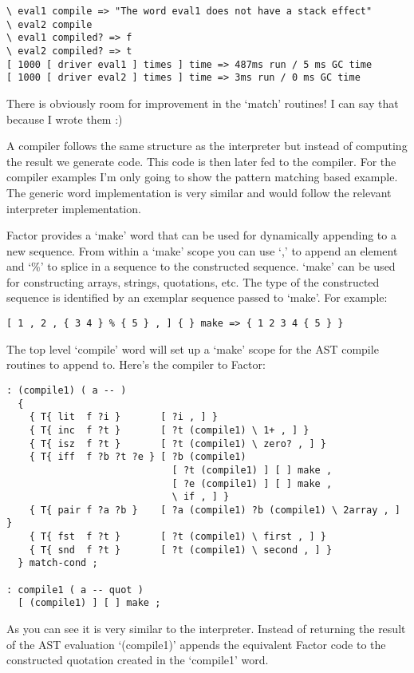 \begin{verbatim}
\ eval1 compile => "The word eval1 does not have a stack effect"
\ eval2 compile 
\ eval1 compiled? => f
\ eval2 compiled? => t
[ 1000 [ driver eval1 ] times ] time => 487ms run / 5 ms GC time
[ 1000 [ driver eval2 ] times ] time => 3ms run / 0 ms GC time
\end{verbatim}

There is obviously room for improvement in the `match' routines! I can
say that because I wrote them :)

A compiler follows the same structure as the interpreter but instead
of computing the result we generate code. This code is then later fed
to the compiler. For the compiler examples I'm only going to show the
pattern matching based example. The generic word implementation is
very similar and would follow the relevant interpreter implementation.

Factor provides a `make' word that can be used for dynamically appending to a new sequence. From
within a `make' scope you can use `,' to append an element and `\%' to splice in a sequence to the
constructed sequence. `make' can be used for constructing arrays, strings, quotations, etc. The type
of the constructed sequence is identified by an exemplar sequence passed to `make'. For example:

\begin{verbatim}
[ 1 , 2 , { 3 4 } % { 5 } , ] { } make => { 1 2 3 4 { 5 } }
\end{verbatim}

The top level `compile' word will set up a `make' scope for the AST
compile routines to append to. Here's the compiler to Factor:

\begin{verbatim}
: (compile1) ( a -- )
  {
    { T{ lit  f ?i }       [ ?i , ] }
    { T{ inc  f ?t }       [ ?t (compile1) \ 1+ , ] }
    { T{ isz  f ?t }       [ ?t (compile1) \ zero? , ] }
    { T{ iff  f ?b ?t ?e } [ ?b (compile1) 
                             [ ?t (compile1) ] [ ] make , 
                             [ ?e (compile1) ] [ ] make , 
                             \ if , ] }
    { T{ pair f ?a ?b }    [ ?a (compile1) ?b (compile1) \ 2array , ] }
    { T{ fst  f ?t }       [ ?t (compile1) \ first , ] }
    { T{ snd  f ?t }       [ ?t (compile1) \ second , ] }
  } match-cond ;  

: compile1 ( a -- quot )
  [ (compile1) ] [ ] make ;
\end{verbatim}

As you can see it is very similar to the interpreter. Instead of
returning the result of the AST evaluation `(compile1)' appends the
equivalent Factor code to the constructed quotation created in the
`compile1' word.

